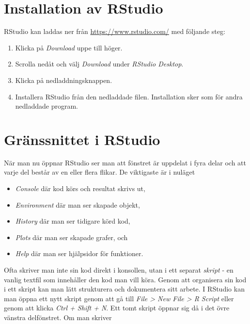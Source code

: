 \documentclass[
]{book}
\providecommand{\tightlist}{%
  \setlength{\itemsep}{0pt}\setlength{\parskip}{0pt}}
\theoremstyle{definition}
\theoremstyle{definition}
\theoremstyle{definition}
\theoremstyle{definition}
\theoremstyle{remark}
\begin{document}
\hypertarget{installation-av-rstudio}{%
\section{Installation av RStudio}\label{installation-av-rstudio}}

RStudio kan laddas ner från \url{https://www.rstudio.com/} med följande steg:

\begin{enumerate}
\def\labelenumi{\arabic{enumi}.}
\tightlist
\item
  Klicka på \emph{Download} uppe till höger.
\item
  Scrolla nedåt och välj \emph{Download} under \emph{RStudio Desktop}.
\item
  Klicka på nedladdningsknappen.
\item
  Installera RStudio från den nedladdade filen. Installation sker som för andra nedladdade program.
\end{enumerate}

\hypertarget{gruxe4nssnittet-i-rstudio}{%
\section{Gränssnittet i RStudio}\label{gruxe4nssnittet-i-rstudio}}

När man nu öppnar RStudio ser man att fönstret är uppdelat i fyra delar och att varje del består av en eller flera flikar. De viktigaste är i nuläget

\begin{itemize}
\tightlist
\item
  \emph{Console} där kod körs och resultat skrivs ut,
\item
  \emph{Environment} där man ser skapade objekt,
\item
  \emph{History} där man ser tidigare körd kod,
\item
  \emph{Plots} där man ser skapade grafer, och
\item
  \emph{Help} där man ser hjälpsidor för funktioner.
\end{itemize}

Ofta skriver man inte sin kod direkt i konsollen, utan i ett separat \emph{skript} - en vanlig textfil som innehåller den kod man vill köra. Genom att organisera sin kod i ett skript kan man lätt strukturera och dokumentera sitt arbete. I RStudio kan man öppna ett nytt skript genom att gå till \emph{File \textgreater{} New File \textgreater{} R Script} eller genom att klicka \emph{Ctrl + Shift + N}. Ett tomt skript öppnar sig då i det övre vänstra delfönstret. Om man skriver
\end{document}
